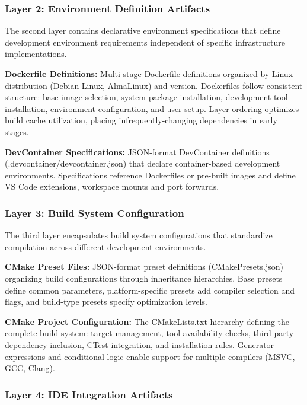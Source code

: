 \subsubsection{Layer 2: Environment Definition Artifacts}

The second layer contains declarative environment specifications that define development environment requirements independent of specific infrastructure implementations.

\textbf{Dockerfile Definitions:} Multi-stage Dockerfile definitions organized by Linux distribution (Debian Linux, AlmaLinux) and version.
Dockerfiles follow consistent structure: base image selection, system package installation, development tool installation, environment configuration, and user setup.
Layer ordering optimizes build cache utilization, placing infrequently-changing dependencies in early stages.

\textbf{DevContainer Specifications:} JSON-format DevContainer definitions (.devcontainer/devcontainer.json) that declare container-based development environments.
Specifications reference Dockerfiles or pre-built images and define VS Code extensions, workspace mounts and port forwards.

\subsubsection{Layer 3: Build System Configuration}

The third layer encapsulates build system configurations that standardize compilation across different development environments.

\textbf{CMake Preset Files:} JSON-format preset definitions (CMakePresets.json) organizing build configurations through inheritance hierarchies.
Base presets define common parameters, platform-specific presets add compiler selection and flags, and build-type presets specify optimization levels.

\textbf{CMake Project Configuration:} The CMakeLists.txt hierarchy defining the complete build system: target management, tool availability checks, third-party dependency inclusion, CTest integration, and installation rules.
Generator expressions and conditional logic enable support for multiple compilers (MSVC, GCC, Clang).

\subsubsection{Layer 4: IDE Integration Artifacts}

